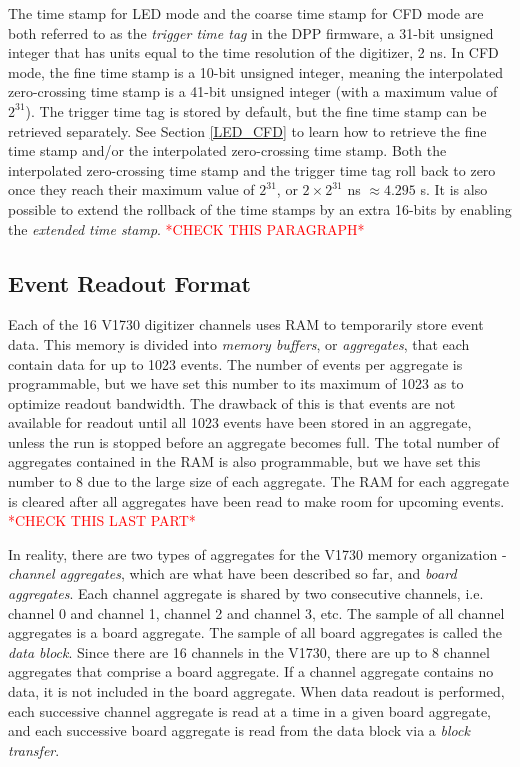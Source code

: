 The time stamp for LED mode and the coarse time stamp for CFD mode are both referred to as the \textit{trigger time tag} in the DPP firmware, a 31-bit unsigned integer that has units equal to the time resolution of the digitizer, 2 ns. In CFD mode, the fine time stamp is a 10-bit unsigned integer, meaning the interpolated zero-crossing time stamp is a 41-bit unsigned integer (with a maximum value of $2^{31}$). The trigger time tag is stored by default, but the fine time stamp can be retrieved separately. See Section \ref{LED_CFD} to learn how to retrieve the fine time stamp and/or the interpolated zero-crossing time stamp. Both the interpolated zero-crossing time stamp and the trigger time tag roll back to zero once they reach their maximum value of $2^{31}$, or $2 \times 2^{31}$ ns $\approx 4.295$ s. It is also possible to extend the rollback of the time stamps by an extra 16-bits by enabling the \textit{extended time stamp}. \textcolor{red}{*CHECK THIS PARAGRAPH*} %

\subsection{Event Readout Format} \label{memory}

Each of the 16 V1730 digitizer channels uses RAM to temporarily store event data. This memory is divided into \textit{memory buffers}, or \textit{aggregates}, that each contain data for up to 1023 events. The number of events per aggregate is programmable, but we have set this number to its maximum of 1023 as to optimize readout bandwidth. The drawback of this is that events are not available for readout until all 1023 events have been stored in an aggregate, unless the run is stopped before an aggregate becomes full. The total number of aggregates contained in the RAM is also programmable, but we have set this number to 8 due to the large size of each aggregate. The RAM for each aggregate is cleared after all aggregates have been read to make room for upcoming events. \textcolor{red}{*CHECK THIS LAST PART*} %

In reality, there are two types of aggregates for the V1730 memory organization - \textit{channel aggregates}, which are what have been described so far, and \textit{board aggregates}. Each channel aggregate is shared by two consecutive channels, i.e. channel 0 and channel 1, channel 2 and channel 3, etc. The sample of all channel aggregates is a board aggregate. The sample of all board aggregates is called the \textit{data block}. Since there are 16 channels in the V1730, there are up to 8 channel aggregates that comprise a board aggregate. If a channel aggregate contains no data, it is not included in the board aggregate. When data readout is performed, each successive channel aggregate is read at a time in a given board aggregate, and each successive board aggregate is read from the data block via a \textit{block transfer}.

